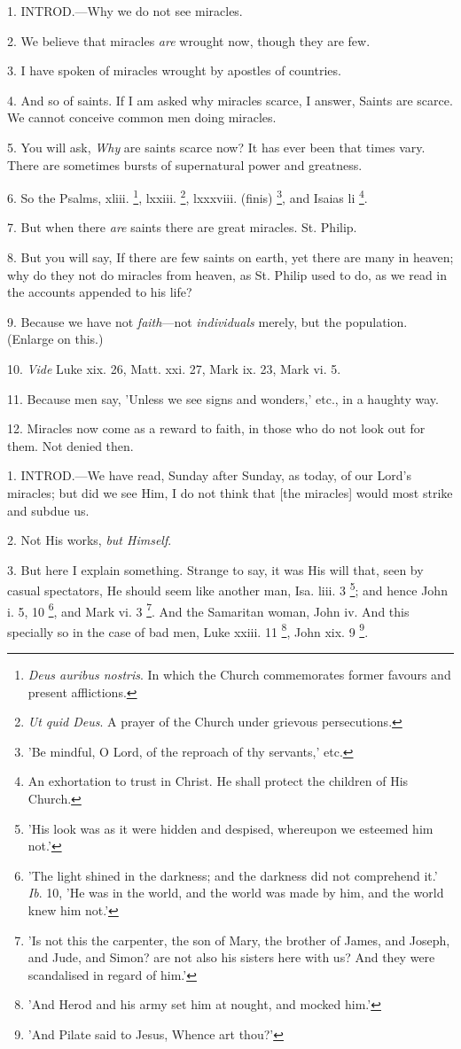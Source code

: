 1. INTROD.—Why
we do not see miracles.

2. We believe that miracles \emph{are} wrought
now, though they are few.

3. I have spoken of miracles wrought by apostles
of countries.

4. And so of saints. If I am asked why miracles
scarce, I answer, Saints are scarce. We cannot conceive common men
doing miracles.

5. You will ask, \emph{Why} are saints scarce
now? It has ever been that times vary. There are sometimes bursts of
supernatural power and greatness.

6. So the Psalms, xliii. \footnote{\emph{Deus auribus nostris}.
In which the Church commemorates former favours and present
afflictions.}, lxxiii. \footnote{\emph{Ut quid Deus}. A
prayer of the Church under grievous persecutions.},
lxxxviii. (finis) \footnote{'Be mindful, O Lord, of
the reproach of thy servants,' etc.}, and
Isaias li \footnote{An exhortation to trust
in Christ. He shall protect the children of His Church.}.

7. But when there \emph{are} saints there are
great miracles. St. Philip.

8. But you will say, If there are few saints on
earth, yet there are many in heaven; why do they not do miracles from
heaven, as St. Philip used to do, as we read in the accounts appended
to his life?

9. Because we have not \emph{faith}—not \emph{individuals}
merely, but the population. (Enlarge on this.)

10. \emph{Vide} Luke xix. 26, Matt. xxi. 27, Mark
ix. 23, Mark vi. 5.

11. Because men say, 'Unless we see signs and
wonders,' etc., in a haughty way.

12. Miracles now come as a reward to faith, in
those who do not look out for them. Not denied then.


1. INTROD.—We
have read, Sunday after Sunday, as today, of our Lord's miracles; but
did we see Him, I do not think that [the miracles] would most strike
and subdue us.

2. Not His works, \emph{but Himself}.

3. But here I explain something. Strange to say,
it was His will that, seen by casual spectators, He should seem like
another man, Isa. liii. 3 \footnote{'His look was as it were
hidden and despised, whereupon we esteemed him not.'};
and hence John i. 5, 10 \footnote{'The light shined in the
darkness; and the darkness did not comprehend it.' \emph{Ib}. 10, 'He
was in the world, and the world was made by him, and the world knew
him not.'},
and Mark vi. 3 \footnote{'Is not this the
carpenter, the son of Mary, the brother of James, and Joseph, and
Jude, and Simon? are not also his sisters here with us? And they were
scandalised in regard of him.'}. And
the Samaritan woman, John iv. And this specially so in the case
of bad men, Luke xxiii. 11 \footnote{'And Herod and his army
set him at nought, and mocked him.'},
John xix. 9 \footnote{'And Pilate said to
Jesus, Whence art thou?'}.

